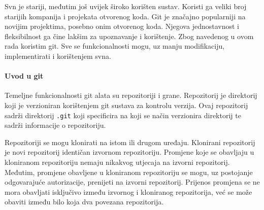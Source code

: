 \documentclass[times, utf8, diplomski, numeric]{fer}
\begin{document}
Svn je stariji, međutim još uvijek široko korišten sustav. Koristi ga veliki broj starijih kompanija i projekata otvorenog koda. Git je značajno popularniji na novijim projektima, posebno onim otvorenog koda. Njegova jednostavnost i fleksibilnost ga čine lakšim za upoznavanje i korištenje. Zbog navedenog u ovom rada koristim git. Sve se funkcionalnosti mogu, uz manju modifikaciju, implementirati i korištenjem svna.


\paragraph{Uvod u git}

Temeljne funkcionalnosti git alata su repozitoriji i grane. Repozitorij je direktorij koji je verzioniran korištenjem git sustava za kontrolu verzija. Ovaj repozitorij sadrži direktorij \verb|.git| koji specificira na koji se način verzionira direktorij te sadrži informacije o repozitoriju.

Repozitoriji se mogu klonirati na istom ili drugom uređaju. Klonirani repozitorij je novi repozitorij identičan izvornom repozitoriju. Promjene koje se obavljaju u kloniranom repozitoriju nemaju nikakvog utjecaja na izvorni repozitorij. Međutim, promjene obavljene u kloniranom repozitoriju se mogu, uz postojanje odgovarajuće autorizacije, prenijeti na izvorni repozitorij. Prijenos promjena se ne mora obavljati isključivo između izvornog i kloniranog repozitorija, već se može obaviti između bilo koja dva povezana repozitorija.
\end{document}

